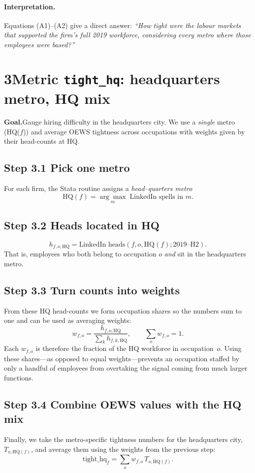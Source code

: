 \documentclass[11pt]{article}
\begin{document}
\paragraph{Interpretation.}  Equations (A1)--(A2) give a direct answer:
\emph{“How tight were the labour markets that supported the firm’s full
2019 workforce, considering every metro where those employees were
based?”}

\section*{3\quad Metric \texttt{tight\_hq}: headquarters metro, HQ mix}


\textbf{Goal.}\;Gauge hiring difficulty in the headquarters city.  We use a
\emph{single} metro (HQ($f$)) and average OEWS tightness across
occupations with weights given by their head-counts at HQ.

\subsection*{Step 3.1\; Pick one metro}
For each firm, the Stata routine assigns a \emph{head--quarters metro}
\[\text{HQ}(f)=\underset{m}{\arg\max}\;\text{LinkedIn spells in }m.\]

\subsection*{Step 3.2\; Heads located in HQ}\vspace{-0.3em}
\[
  h_{f,o,\text{HQ}} = \text{LinkedIn heads}(f, o, \text{HQ}(f); 2019\text{--H2}).
\]
That is, employees who both belong to occupation $o$ \emph{and} sit in
the headquarters metro.

\subsection*{Step 3.3\; Turn counts into weights}
From these HQ head-counts we form occupation shares so the numbers sum to
one and can be used as averaging weights:
\[
  w_{f,o}=\frac{h_{f,o,\text{HQ}}}{\sum_k h_{f,k,\text{HQ}}}, \qquad \textstyle\sum_o w_{f,o}=1.
\]
Each $w_{f,o}$ is therefore the fraction of the HQ workforce in
occupation~$o$.  Using these shares—as opposed to equal weights—prevents
an occupation staffed by only a handful of employees from overtaking the
signal coming from much larger functions.

\subsection*{Step 3.4\; Combine OEWS values with the HQ mix}
Finally, we take the metro-specific tightness numbers for the
headquarters city, \(T_{o,\text{HQ}(f)}\), and average them using the
weights from the previous step:
\[
  \boxed{\text{tight\_hq}_f=\sum_o w_{f,o}\,T_{o,\text{HQ}(f)}.}\tag{B1}
\]
\end{document}
